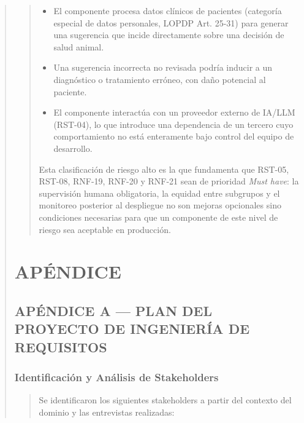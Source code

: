\documentclass[
]{article}
\begin{document}
\begin{quote}
\begin{quote}
\begin{itemize}
  \item El componente procesa datos clínicos de pacientes (categoría
  especial de datos personales, LOPDP Art. 25-31) para generar una
  sugerencia que incide directamente sobre una decisión de salud animal.
  \item Una sugerencia incorrecta no revisada podría inducir a un
  diagnóstico o tratamiento erróneo, con daño potencial al paciente.
  \item El componente interactúa con un proveedor externo de IA/LLM
  (RST-04), lo que introduce una dependencia de un tercero cuyo
  comportamiento no está enteramente bajo control del equipo de
  desarrollo.
\end{itemize}

Esta clasificación de riesgo alto es la que fundamenta que RST-05,
RST-08, RNF-19, RNF-20 y RNF-21 sean de prioridad \emph{Must have}: la
supervisión humana obligatoria, la equidad entre subgrupos y el
monitoreo posterior al despliegue no son mejoras opcionales sino
condiciones necesarias para que un componente de este nivel de riesgo
sea aceptable en producción.
\end{quote}

\section{APÉNDICE}
\label{apendice-general}
\subsection{APÉNDICE A --- PLAN DEL PROYECTO DE INGENIERÍA DE
REQUISITOS}\label{apuxe9ndice-a-plan-del-proyecto-de-ingenieruxeda-de-requisitos}

\subsubsection{Identificación y Análisis de
Stakeholders}\label{identificaciuxf3n-y-anuxe1lisis-de-stakeholders}

\begin{quote}
Se identificaron los siguientes stakeholders a partir del contexto del
dominio y las entrevistas realizadas:
\end{quote}


\end{quote}
\end{document}
